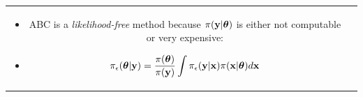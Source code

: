 \documentclass[portrait,a0b,final,a4resizeable]{include/a0poster}
\begin{document}
\begin{poster}
\begin{multicols}{3}

\begin{tabular}{cc}
\begin{minipage}[c]{0.57\columnwidth}
  \begin{itemize}
  	\item ABC is a \emph{likelihood-free} method because $\pi( {\bf y} | {\bm \theta})$ is either not computable or very expensive: \item[] \begin{equation}
  	\pi_\epsilon( {\bm \theta} | {\bf y} ) = \frac{\pi({\bm \theta})}{\pi({\bf y})} \int \pi_\epsilon({\bf y}|{\bf x}) \pi({\bf x}|{\bm \theta}) d {\bf x} \nonumber
  \end{equation}
    

\end{itemize}
\end{minipage}
\end{tabular}
\end{multicols}
\end{poster}
\end{document}
